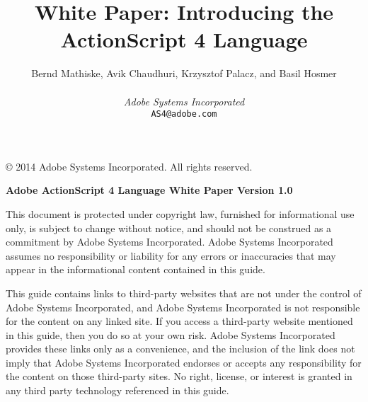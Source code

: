 





\title{White Paper: Introducing the ActionScript\textsuperscript{\textregistered} 4
Language} \author{Bernd Mathiske, Avik Chaudhuri, Krzysztof Palacz, and Basil Hosmer\\
\\
{\it Adobe Systems Incorporated} \\
{\tt AS4@adobe.com}}



\maketitle

\pagebreak

\copyright{} 2014 Adobe Systems Incorporated. All rights reserved. %

{\bf Adobe ActionScript 4 Language White Paper Version 1.0}

This document is protected under copyright law, furnished for informational use
only, is subject to change without notice, and should not be construed as a commitment by Adobe Systems Incorporated.
Adobe Systems Incorporated assumes no responsibility or liability for any errors or inaccuracies
that may appear in the informational content contained in this guide.

This guide contains links to third-party websites that are not under the control of Adobe Systems
Incorporated, and Adobe Systems Incorporated is not responsible for the content on any linked site.
If you access a third-party website mentioned in this guide, then you do so at your own risk. Adobe
Systems Incorporated provides these links only as a convenience, and the inclusion of the link does
not imply that Adobe Systems Incorporated endorses or accepts any responsibility for the content on
those third-party sites. No right, license, or interest is granted in any third party technology
referenced in this guide.

